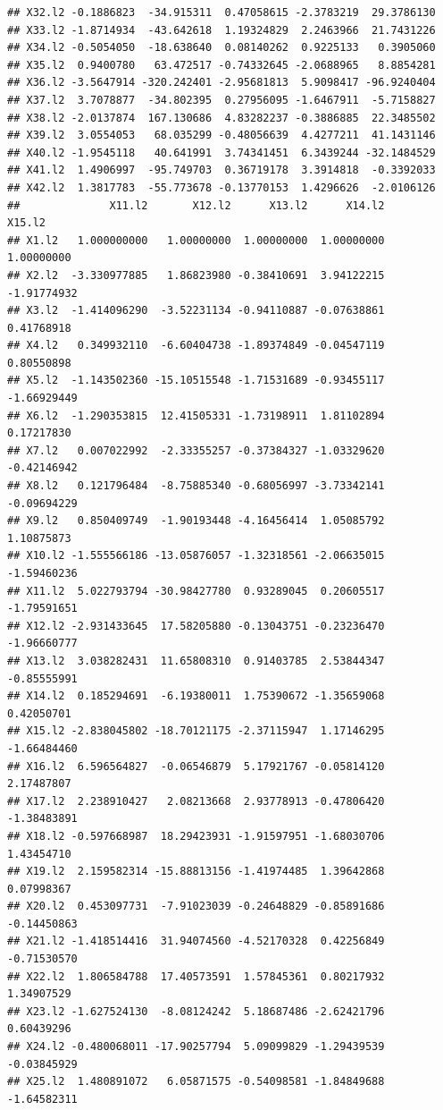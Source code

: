 \documentclass[]{article}
\begin{document}
\begin{verbatim}
## X32.l2 -0.1886823  -34.915311  0.47058615 -2.3783219  29.3786130
## X33.l2 -1.8714934  -43.642618  1.19324829  2.2463966  21.7431226
## X34.l2 -0.5054050  -18.638640  0.08140262  0.9225133   0.3905060
## X35.l2  0.9400780   63.472517 -0.74332645 -2.0688965   8.8854281
## X36.l2 -3.5647914 -320.242401 -2.95681813  5.9098417 -96.9240404
## X37.l2  3.7078877  -34.802395  0.27956095 -1.6467911  -5.7158827
## X38.l2 -2.0137874  167.130686  4.83282237 -0.3886885  22.3485502
## X39.l2  3.0554053   68.035299 -0.48056639  4.4277211  41.1431146
## X40.l2 -1.9545118   40.641991  3.74341451  6.3439244 -32.1484529
## X41.l2  1.4906997  -95.749703  0.36719178  3.3914818  -0.3392033
## X42.l2  1.3817783  -55.773678 -0.13770153  1.4296626  -2.0106126
##              X11.l2       X12.l2      X13.l2      X14.l2      X15.l2
## X1.l2   1.000000000   1.00000000  1.00000000  1.00000000  1.00000000
## X2.l2  -3.330977885   1.86823980 -0.38410691  3.94122215 -1.91774932
## X3.l2  -1.414096290  -3.52231134 -0.94110887 -0.07638861  0.41768918
## X4.l2   0.349932110  -6.60404738 -1.89374849 -0.04547119  0.80550898
## X5.l2  -1.143502360 -15.10515548 -1.71531689 -0.93455117 -1.66929449
## X6.l2  -1.290353815  12.41505331 -1.73198911  1.81102894  0.17217830
## X7.l2   0.007022992  -2.33355257 -0.37384327 -1.03329620 -0.42146942
## X8.l2   0.121796484  -8.75885340 -0.68056997 -3.73342141 -0.09694229
## X9.l2   0.850409749  -1.90193448 -4.16456414  1.05085792  1.10875873
## X10.l2 -1.555566186 -13.05876057 -1.32318561 -2.06635015 -1.59460236
## X11.l2  5.022793794 -30.98427780  0.93289045  0.20605517 -1.79591651
## X12.l2 -2.931433645  17.58205880 -0.13043751 -0.23236470 -1.96660777
## X13.l2  3.038282431  11.65808310  0.91403785  2.53844347 -0.85555991
## X14.l2  0.185294691  -6.19380011  1.75390672 -1.35659068  0.42050701
## X15.l2 -2.838045802 -18.70121175 -2.37115947  1.17146295 -1.66484460
## X16.l2  6.596564827  -0.06546879  5.17921767 -0.05814120  2.17487807
## X17.l2  2.238910427   2.08213668  2.93778913 -0.47806420 -1.38483891
## X18.l2 -0.597668987  18.29423931 -1.91597951 -1.68030706  1.43454710
## X19.l2  2.159582314 -15.88813156 -1.41974485  1.39642868  0.07998367
## X20.l2  0.453097731  -7.91023039 -0.24648829 -0.85891686 -0.14450863
## X21.l2 -1.418514416  31.94074560 -4.52170328  0.42256849 -0.71530570
## X22.l2  1.806584788  17.40573591  1.57845361  0.80217932  1.34907529
## X23.l2 -1.627524130  -8.08124242  5.18687486 -2.62421796  0.60439296
## X24.l2 -0.480068011 -17.90257794  5.09099829 -1.29439539 -0.03845929
## X25.l2  1.480891072   6.05871575 -0.54098581 -1.84849688 -1.64582311

\end{verbatim}
\end{document}

